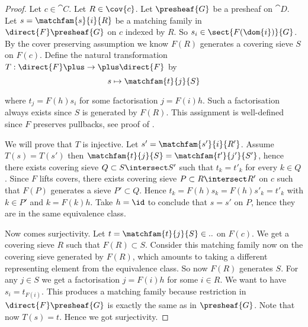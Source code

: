 
\begin{proof}
Let $c \in \cat{C}$.
Let $R \in \cov{c}$.
Let $\presheaf{G}$ be a presheaf on $\cat{D}$.
Let $s = \matchfam{s}{i}{R}$ be a matching family in $\direct{F}\presheaf{G}$ 
on $c$ indexed by $R$. So $s_i \in \sect{F(\dom{i})}{G}$.
By the cover preserving assumption we know $F(R)$ generates a covering sieve $S$ on $F(c)$.
Define the natural transformation $T: \direct{F}\plus \rightarrow \plus \direct{F}$ by 
\[ s \mapsto \matchfam{t}{j}{S} \]

where $t_j = F(h)s_i$ for some factorisation $j=F(i)h$. 
Such a factorisation always exists since $S$ is generated by $F(R)$.
This assignment is well-defined since $F$ preserves pullbacks, see proof of \cite[Lemma 2.3.3]{elephant}.

We will prove that $T$ is injective.
Let $s' = \matchfam{s'}{i}{R'}$.
Assume $T(s)=T(s')$
then $\matchfam{t}{j}{S} = \matchfam{t'}{j'}{S'}$,
hence there exists covering sieve $Q \subset S\intersect S'$
such that $t_k = t'_k$ for every $k\in Q$.
Since $F$ lifts covers, there exists covering sieve $P\subset R\intersect R'$ on $c$
such that $F(P)$ generates a sieve $P'\subset Q$.
Hence $t_k = F(h)s_k = F(h)s'_k = t'_k$ with $k\in P'$ and $k=F(k)h$.
Take $h=\id$ to conclude that $s=s'$ on $P$, hence they are in the same equivalence class.

Now comes surjectivity.
Let $t = \matchfam{t}{j}{S}\in..$ on $F(c)$.
We get a covering sieve $R$ such that $F(R)\subset S$.
Consider this matching family now on the covering sieve generated by $F(R)$, which amounts to taking a different representing element from the equivalence class. So now $F(R)$ generates $S$.
For any $j\in S$ we get a factorisation $j=F(i)h$ for some $i\in R$.
We want to have $s_i = t_{F(i)}$. 
This produces a matching family because restriction in $\direct{F}\presheaf{G}$ is exactly the same as in $\presheaf{G}$.
Note that now $T(s) = t$. Hence we got surjectivity.
\end{proof}


